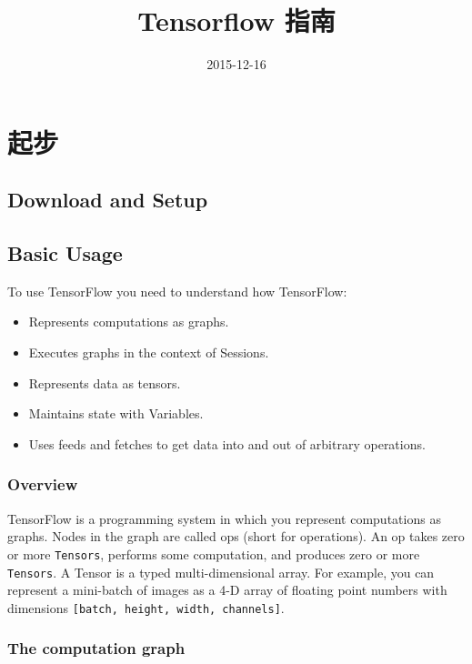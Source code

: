 \documentclass[a4paper,11pt,twoside]{ctexbook}
\title{Tensorflow 指南}
\author{}
\date{2015-12-16}
\begin{document}
\maketitle
\newpage
\tableofcontents
\newpage

\chapter{起步}

\section{Download and Setup}

\newpage

\section{Basic Usage}

To use TensorFlow you need to understand how TensorFlow:

\begin{itemize}
\item Represents computations as graphs.
\item Executes graphs in the context of Sessions.
\item Represents data as tensors.
\item Maintains state with Variables.
\item Uses feeds and fetches to get data into and out of arbitrary operations.
\end{itemize}

\subsection{Overview}

TensorFlow is a programming system in which you represent computations as graphs. Nodes in the graph are called ops (short for operations). An op takes zero or more \lstinline{Tensors}, performs some computation, and produces zero or more \lstinline{Tensors}. A Tensor is a typed multi-dimensional array. For example, you can represent a mini-batch of images as a 4-D array of floating point numbers with dimensions \lstinline{[batch, height, width, channels]}.

\subsection{The computation graph}
\end{document}
